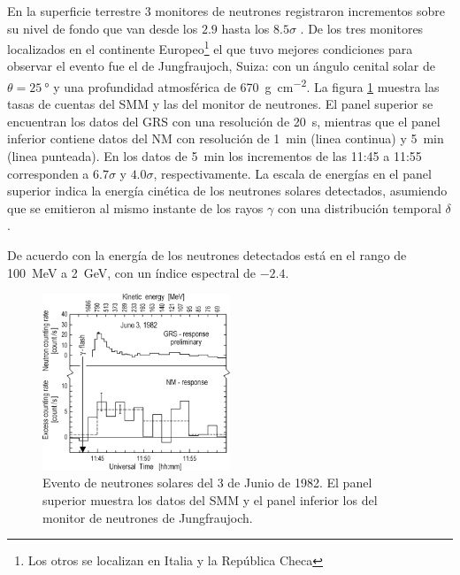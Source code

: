 En la superficie terrestre \num{3} monitores de neutrones registraron incrementos sobre su nivel de fondo que van desde los $2.9$ hasta los $8.5\sigma$ \cite{chupp87}. De los tres monitores localizados en el continente Europeo\footnote{Los otros se localizan en Italia y la República Checa} el que tuvo mejores condiciones para observar el evento fue el de  Jungfraujoch, Suiza: con un ángulo cenital solar de $\theta=\SI{25}{\degree}$ y una profundidad atmosférica de \SI{670}{\gram\per\square\cm}. La figura \ref{fig:neutrons-ground} muestra las tasas de cuentas del SMM y las del monitor de neutrones. El panel superior se encuentran los datos del GRS con una resolución de \SI{20}{\second}, mientras que el panel inferior contiene datos del NM con resolución de \SI{1}{\minute} (linea continua) y \SI{5}{\minute} (linea punteada). En los datos de \SI{5}{\minute} los incrementos de las 11:45 a 11:55 corresponden a $6.7\sigma$ y $4.0\sigma$, respectivamente. La escala de energías en el panel superior indica la energía cinética de los neutrones solares detectados, asumiendo que se emitieron al mismo instante de los rayos $\gamma$ con una distribución temporal $\delta$.

De acuerdo con \cite{chupp87} la energía de los neutrones detectados está en el rango de \SI{100}{\mega\electronvolt} a \SI{2}{\giga\electronvolt}, con un índice espectral de $-2.4$.

\begin{figure}
        \centering
        \includegraphics[width=0.5\textwidth]{neutrons-ground.png}
        \caption{Evento de neutrones solares del \num{3} de Junio de \num{1982}. El panel superior muestra los datos del SMM y el panel inferior los del monitor de neutrones de Jungfraujoch.}
        \label{fig:neutrons-ground}
\end{figure}

